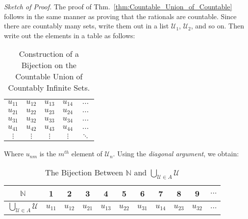 \documentclass[crop=false,class=book,oneside]{standalone}
\begin{document}
            \textit{Sketch of Proof.} The proof of
            Thm.~\ref{thm:Countable_Union_of_Countable}
            follows in the same manner
            as proving that the rationals are countable. Since
            there are countably many sets, write them out in
            a list $\mathcal{U}_{1}$, $\mathcal{U}_{2}$, and
            so on. Then write out the elements in a table as
            follows:
            \begin{table}[H]
                \captionsetup{type=table}
                \centering
                \begin{tabular}{ccccc}
                    $u_{11}$&$u_{12}$&$u_{13}$
                    &$u_{14}$&$\hdots$\\
                    $u_{21}$&$u_{22}$&$u_{23}$
                    &$u_{24}$&$\hdots$\\
                    $u_{31}$&$u_{32}$&$u_{33}$
                    &$u_{34}$&$\hdots$\\
                    $u_{41}$&$u_{42}$&$u_{43}$
                    &$u_{44}$&$\hdots$\\
                    $\vdots$&$\vdots$&$\vdots$
                    &$\vdots$&$\ddots$
                \end{tabular}
                \caption{Construction of a Bijection on the
                         Countable Union of Countably Infinite
                         Sets.}
                \label{table:Func_Countable_Union_of_Countable}
            \end{table}
            Where $u_{nm}$ is the $m^{th}$ element of
            $\mathcal{U}_{n}$.
            Using the \textit{diagonal argument},
            we obtain:
            \begin{table}[H]
                \captionsetup{type=table}
                \centering
                \begin{tabular}{|c|c|c|c|c|c|c|c|c|c|c|}
                    \hline
                    $\mathbb{N}$&1&2&3&4&5&6&7&8&9&$\hdots$\\
                    \hline
                    $\bigcup_{\mathcal{U}\in{A}}\mathcal{U}$&
                    $u_{11}$&$u_{12}$&$u_{21}$&$u_{13}$&
                    $u_{22}$&$u_{31}$&$u_{14}$&$u_{23}$&
                    $u_{32}$&$\hdots$\\
                    \hline
                \end{tabular}
                \caption{The Bijection Between $\mathbb{N}$ and
                         $\bigcup_{\mathcal{U}\in{A}}\mathcal{U}$}
                \label{table:Bijection_on_Countable_Union}
            \end{table}
\end{document}
